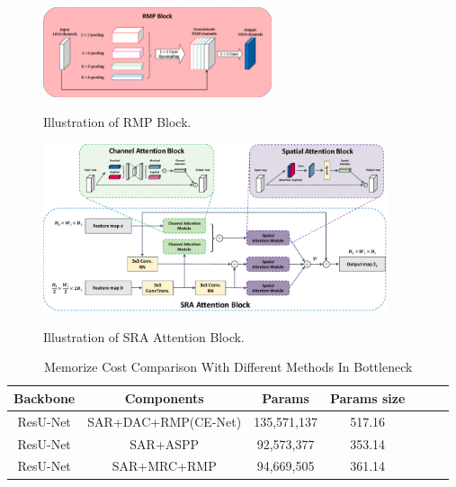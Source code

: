 \documentclass[UTF8]{article} %
\begin{document}
\begin{figure}[ht]
  \begin{center}
  \includegraphics[width=0.6\textwidth]{rmp_block.pdf}
  \vspace{-2mm}
  \caption{Illustration of RMP Block.} 
  \vspace{-2mm}
  \label{fig:rmp_block}
  \end{center}
  \vspace{-0.35cm}
\end{figure}

\begin{figure}[ht]
  \begin{center}
  \includegraphics[width=0.9\textwidth]{Attention.pdf}  
  \label{fig:Attention}
  \vspace{-2mm}
  \caption{Illustration of SRA Attention Block.} 
  \vspace{-2mm}
\end{center}
  \vspace{-0.35cm}
\end{figure}

\begin{table}[H]
  \vspace{-2mm}
  \begin{center}\small
  \label{param-table}
  \begin{tabular}{ccccccc}
    
  \toprule
  Backbone & Components & Params & Params size \\
  \midrule
    ResU-Net & SAR+DAC+RMP(CE-Net) & 135,571,137 & 517.16 \\
    ResU-Net & SAR+ASPP    & 92,573,377 & 353.14  \\
    ResU-Net & SAR+MRC+RMP & 94,669,505 & 361.14  \\
\bottomrule    
  \end{tabular}
  \caption{Memorize Cost Comparison With Different Methods In Bottleneck}
\end{center}
  \vspace{-4mm}
\end{table}
\end{document}
